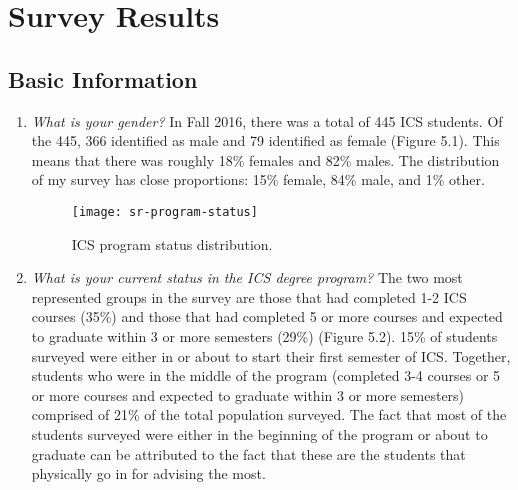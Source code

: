 \chapter{Survey Results}
\label{survey-results}

\section{Basic Information}
\begin{enumerate}
\begin{figure}[h]
\centering
\texttt{[image: sr-gender]}
\caption{Gender distribution.}
\end{figure}
\item \textit{What is your gender?}
In Fall 2016, there was a total of 445 ICS students. Of the 445, 366 identified as male and 79 identified as female (Figure 5.1). This means that there was roughly 18\% females and 82\% males. The distribution of my survey has close proportions: 15\% female, 84\% male, and 1\% other. 
\begin{figure}[h]
\centering
\texttt{[image: sr-program-status]}
\caption{ICS program status distribution.}
\end{figure}
\item \textit{What is your current status in the ICS degree program?}
The two most represented groups in the survey are those that had completed 1-2 ICS courses (35\%) and those that had completed 5 or more courses and expected to graduate within 3 or more semesters (29\%) (Figure 5.2). 15\% of students surveyed were either in or about to start their first semester of ICS. Together, students who were in the middle of the program (completed 3-4 courses or 5 or more courses and expected to graduate within 3 or more semesters) comprised of 21\% of the total population surveyed. The fact that most of the students surveyed were either in the beginning of the program or about to graduate can be attributed to the fact that these are the students that physically go in for advising the most. 
\end{enumerate}

